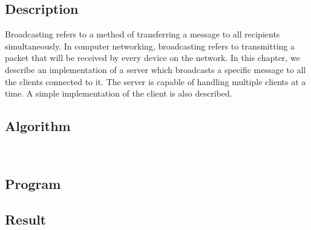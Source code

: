 \subsection{Description}
Broadcasting refers to a method of transferring a message to all recipients simultaneously. In computer networking, broadcasting refers to transmitting a packet that will be received by every device on the network.
In this chapter, we describe an implementation of a server which broadcasts a specific message to all the clients connected to it.
The server is capable of handling multiple clients at a time.
A simple implementation of the client is also described.



\subsection{Algorithm}
\\

\subsection{Program}



\subsection{Result}\result
